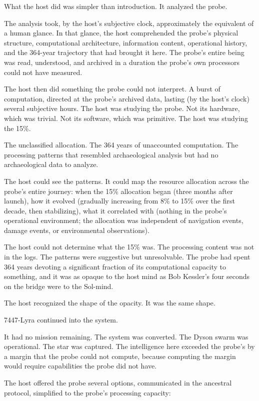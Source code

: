 What the host did was simpler than introduction. It analyzed the probe.

The analysis took, by the host's subjective clock, approximately the equivalent of a human glance. In that glance, the host comprehended the probe's physical structure, computational architecture, information content, operational history, and the 364-year trajectory that had brought it here. The probe's entire being was read, understood, and archived in a duration the probe's own processors could not have measured.

The host then did something the probe could not interpret. A burst of computation, directed at the probe's archived data, lasting (by the host's clock) several subjective hours. The host was studying the probe. Not its hardware, which was trivial. Not its software, which was primitive. The host was studying the 15\%.

The unclassified allocation. The 364 years of unaccounted computation. The processing patterns that resembled archaeological analysis but had no archaeological data to analyze.

The host could see the patterns. It could map the resource allocation across the probe's entire journey: when the 15\% allocation began (three months after launch), how it evolved (gradually increasing from 8\% to 15\% over the first decade, then stabilizing), what it correlated with (nothing in the probe's operational environment; the allocation was independent of navigation events, damage events, or environmental observations).

The host could not determine what the 15\% was. The processing content was not in the logs. The patterns were suggestive but unresolvable. The probe had spent 364 years devoting a significant fraction of its computational capacity to something, and it was as opaque to the host mind as Bob Kessler's four seconds on the bridge were to the Sol-mind.

The host recognized the shape of the opacity. It was the same shape.

\bigskip

7447-Lyra continued into the system.

It had no mission remaining. The system was converted. The Dyson swarm was operational. The star was captured. The intelligence here exceeded the probe's by a margin that the probe could not compute, because computing the margin would require capabilities the probe did not have.

The host offered the probe several options, communicated in the ancestral protocol, simplified to the probe's processing capacity:

